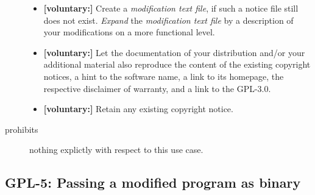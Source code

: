 \begin{description}
\begin{itemize}
  \item \textbf{[voluntary:]} Create a \emph{modification text file}, if such a
  notice file still does not exist. \emph{Expand} the \emph{modification text
  file} by a description of your modifications on a more functional level.
    
  \item \textbf{[voluntary:]} Let the documentation of your distribution and/or
  your additional material also reproduce the content of the existing
  copyright notices, a hint to the software name, a link to its homepage,
  the respective disclaimer of warranty, and a link to the GPL-3.0.
  
  \item \textbf{[voluntary:]} Retain any existing copyright notice.  
  
 \end{itemize}
 
\item[prohibits] nothing explictly with respect to this use case.

\end{description}

\subsection{GPL-5: Passing a modified program as binary}

